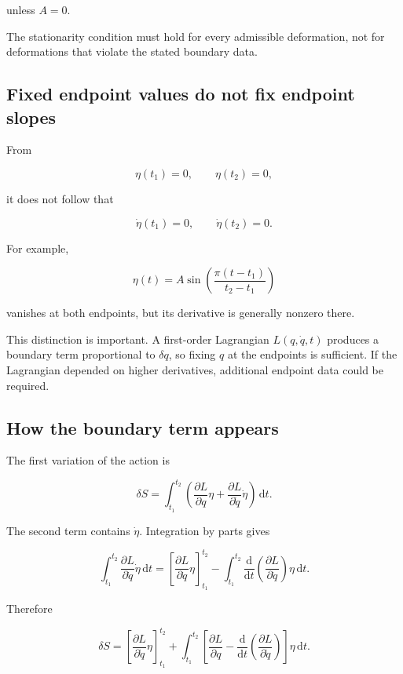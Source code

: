 unless \(A=0\).

The stationarity condition must hold for every admissible deformation, not for deformations that violate the stated boundary data.

\subsection{Fixed endpoint values do not fix endpoint slopes}

From

\[
\eta(t_{1})=0,
\qquad
\eta(t_{2})=0,
\]

it does not follow that

\[
\dot\eta(t_{1})=0,
\qquad
\dot\eta(t_{2})=0.
\]

For example,

\[
\eta(t)
=
A\sin\left(\frac{\pi(t-t_{1})}{t_{2}-t_{1}}\right)
\]

vanishes at both endpoints, but its derivative is generally nonzero there.

This distinction is important. A first-order Lagrangian \(L(q,\dot q,t)\) produces a boundary term proportional to \(\delta q\), so fixing \(q\) at the endpoints is sufficient. If the Lagrangian depended on higher derivatives, additional endpoint data could be required.

\subsection{How the boundary term appears}

The first variation of the action is

\[
\delta S
=
\int_{t_{1}}^{t_{2}}
\left(
\frac{\partial L}{\partial q}\eta
+
\frac{\partial L}{\partial\dot q}\dot\eta
\right)
\,\mathrm{d}t.
\]

The second term contains \(\dot\eta\). Integration by parts gives

\[
\int_{t_{1}}^{t_{2}}
\frac{\partial L}{\partial\dot q}\dot\eta
\,\mathrm{d}t
=
\left[
\frac{\partial L}{\partial\dot q}\eta
\right]_{t_{1}}^{t_{2}}
-
\int_{t_{1}}^{t_{2}}
\frac{\mathrm{d}}{\mathrm{d}t}
\left(
\frac{\partial L}{\partial\dot q}
\right)
\eta
\,\mathrm{d}t.
\]

Therefore

\[
\boxed{
\delta S
=
\left[
\frac{\partial L}{\partial\dot q}\eta
\right]_{t_{1}}^{t_{2}}
+
\int_{t_{1}}^{t_{2}}
\left[
\frac{\partial L}{\partial q}
-
\frac{\mathrm{d}}{\mathrm{d}t}
\left(
\frac{\partial L}{\partial\dot q}
\right)
\right]
\eta
\,\mathrm{d}t
}.
\]

